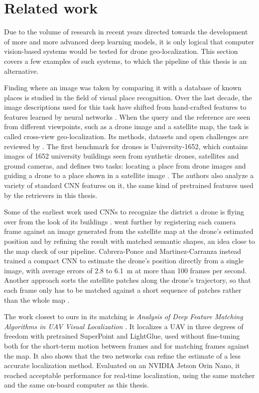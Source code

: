 \documentclass[english, Lau, oneside]{sapthesis}%
\begin{document}
\section{Related work}
\label{sec:bg-related}
Due to the volume of research in recent years directed towards the development of more and more advanced deep learning models, it is only logical that computer vision-based systems would be tested for drone geo-localization. This section covers a few examples of such systems, to which the pipeline of this thesis is an alternative.

Finding where an image was taken by comparing it with a database of known places is studied in the field of visual place recognition. Over the last decade, the image descriptions used for this task have shifted from hand-crafted features to features learned by neural networks \citep{masone2021vpr}. When the query and the reference are seen from different viewpoints, such as a drone image and a satellite map, the task is called cross-view geo-localization. Its methods, datasets and open challenges are reviewed by \citet{durgam2024crossview}. The first benchmark for drones is University-1652, which contains images of 1652 university buildings seen from synthetic drones, satellites and ground cameras, and defines two tasks: locating a place from drone images and guiding a drone to a place shown in a satellite image \citep{zheng2020university}. The authors also analyze a variety of standard CNN features on it, the same kind of pretrained features used by the retrievers in this thesis.

Some of the earliest work used CNNs to recognize the district a drone is flying over from the look of its buildings \citep{amer2017urban}. \citet{nassar2018registration} went further by registering each camera frame against an image generated from the satellite map at the drone's estimated position and by refining the result with matched semantic shapes, an idea close to the map check of our pipeline. Cabrera-Ponce and Martinez-Carranza \citeyearpar{cabrera2022geoloc} instead trained a compact CNN to estimate the drone's position directly from a single image, with average errors of 2.8 to 6.1~m at more than 100 frames per second. Another approach sorts the satellite patches along the drone's trajectory, so that each frame only has to be matched against a short sequence of patches rather than the whole map \citep{wang2024seqmatch}.

The work closest to ours in its matching is \textit{Analysis of Deep Feature Matching Algorithms in UAV Visual Localization} \citep{prutyanov2024deepmatch}. It localizes a UAV in three degrees of freedom with pretrained SuperPoint and LightGlue, used without fine-tuning both for the short-term motion between frames and for matching frames against the map. It also shows that the two networks can refine the estimate of a less accurate localization method. Evaluated on an NVIDIA Jetson Orin Nano, it reached acceptable performance for real-time localization, using the same matcher and the same on-board computer as this thesis.
\end{document}
